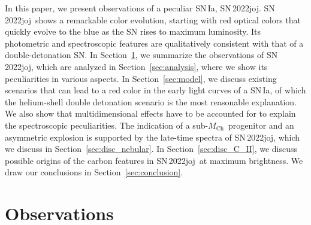 \documentclass[twocolumn]{aastex631}
\newcommand{\sn}{SN\,2022joj}
\newcommand{\Mch}{$M_\mathrm{Ch}$}
\newcommand{\chang}[1]{\textcolor{blue}{[Chang: #1]}}
\begin{document}
\begin{CJK*}{UTF8}{gbsn}
In this paper, we present observations of a peculiar SN\,Ia, \sn. \sn\ shows a remarkable color evolution, starting with red optical colors that quickly evolve to the blue as the SN rises to maximum luminosity. Its photometric and spectroscopic features are qualitatively consistent with that of a double-detonation SN. In Section~\ref{sec:obs}, we summarize the observations of \sn, which are analyzed in Section~\ref{sec:analysis}, where we show its peculiarities in various aspects. In Section~\ref{sec:model}, we discuss existing scenarios that can lead to a red color in the early light curves of a SN\,Ia, of which the helium-shell double detonation scenario is the most reasonable explanation. We also show that multidimensional effects have to be accounted for to explain the spectroscopic peculiarities. 
The indication of a sub-\Mch\ progenitor and an asymmetric explosion is supported by the late-time spectra of \sn, which we discuss in Section~\ref{sec:disc_nebular}. In Section~\ref{sec:disc_C_II}, we discuss possible origins of the carbon features in \sn\ at maximum brightness.
We draw our conclusions in Section~\ref{sec:conclusion}.


\section{Observations} \label{sec:obs}

\end{CJK*}
\end{document}
